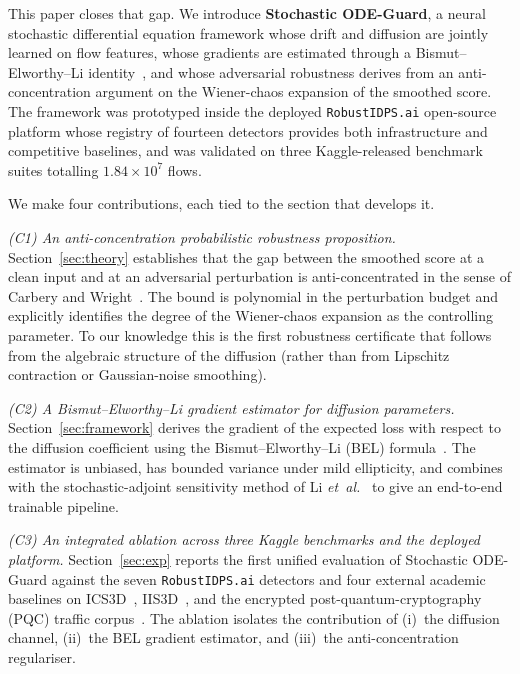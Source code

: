 \documentclass[journal,10pt]{IEEEtran}
\theoremstyle{definition}
\theoremstyle{remark}
\begin{document}
This paper closes that gap. We introduce \textbf{Stochastic ODE-Guard},
a neural stochastic differential equation framework whose drift and
diffusion are jointly learned on flow features, whose gradients are
estimated through a Bismut--Elworthy--Li
identity~\cite{bismut1981martingales,elworthy1994formulae}, and whose
adversarial robustness derives from an anti-concentration argument on
the Wiener-chaos expansion of the smoothed score. The framework was
prototyped inside the deployed \texttt{RobustIDPS.ai} open-source
platform whose registry of fourteen detectors provides both
infrastructure and competitive baselines, and was validated on three
Kaggle-released benchmark suites totalling $1.84\times 10^7$ flows.

We make four contributions, each tied to the section that develops it.

\emph{(C1) An anti-concentration probabilistic robustness proposition.}
Section~\ref{sec:theory} establishes that the gap between the smoothed
score at a clean input and at an adversarial perturbation is
anti-concentrated in the sense of Carbery and
Wright~\cite{carbery2001anticonc}. The bound is polynomial in the
perturbation budget and explicitly identifies the degree of the
Wiener-chaos expansion as the controlling parameter. To our knowledge
this is the first robustness certificate that follows from the
algebraic structure of the diffusion (rather than from Lipschitz
contraction or Gaussian-noise smoothing).

\emph{(C2) A Bismut--Elworthy--Li gradient estimator for diffusion
parameters.} Section~\ref{sec:framework} derives the gradient of the
expected loss with respect to the diffusion coefficient using the
Bismut--Elworthy--Li (BEL)
formula~\cite{bismut1981martingales,elworthy1994formulae,hsu2002}.
The estimator is unbiased, has bounded variance under mild ellipticity,
and combines with the stochastic-adjoint sensitivity
method of Li \textit{et~al.}~\cite{li2020scalable} to give an
end-to-end trainable pipeline.

\emph{(C3) An integrated ablation across three Kaggle benchmarks and
the deployed platform.} Section~\ref{sec:exp} reports the first
unified evaluation of Stochastic ODE-Guard against the seven
\texttt{RobustIDPS.ai} detectors and four external academic baselines
on ICS3D~\cite{ds_ics3d}, IIS3D~\cite{ds_iis3d}, and the encrypted
post-quantum-cryptography (PQC) traffic corpus~\cite{ds_pqcids}.
The ablation isolates the contribution of (i)~the diffusion channel,
(ii)~the BEL gradient estimator, and (iii)~the anti-concentration
regulariser.
\end{document}
